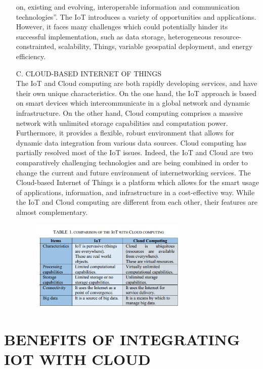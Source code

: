\documentclass[11pt]{article}
\begin{document}
\begin{itemize}
on, existing and evolving, interoperable information and
communication technologies”. The IoT introduces a
variety of opportunities and applications. However, it faces
many challenges which could potentially hinder its successful implementation, such as data storage, heterogeneous resource-constrainted, scalability, Things, variable geospatial
deployment, and energy efficiency.
\item[C.] CLOUD-BASED INTERNET OF THINGS \\
The IoT and Cloud computing are both rapidly developing
services, and have their own unique characteristics. On the one
hand, the IoT approach is based on smart devices which
intercommunicate in a global network and dynamic
infrastructure. On the other hand, Cloud computing
comprises a massive network with unlimited storage
capabilities and computation power. Furthermore, it provides a
flexible, robust environment that allows for dynamic data
integration from various data sources. Cloud computing has
partially resolved most of the IoT issues. Indeed, the IoT and
Cloud are two comparatively challenging technologies and are
being combined in order to change the current and future
environment of internetworking services.
The Cloud-based Internet of Things is a platform which
allows for the smart usage of applications, information, and
infrastructure in a cost-effective way. While the IoT and Cloud
computing are different from each other, their features are
almost complementary.
  \begin{figure}[h]
  \centering
  \includegraphics[width=0.7\textwidth]{fig/Screenshot (904).png}
  \end{figure}
\end{itemize}
\section{BENEFITS OF INTEGRATING IOT WITH CLOUD}\\
\end{document}
